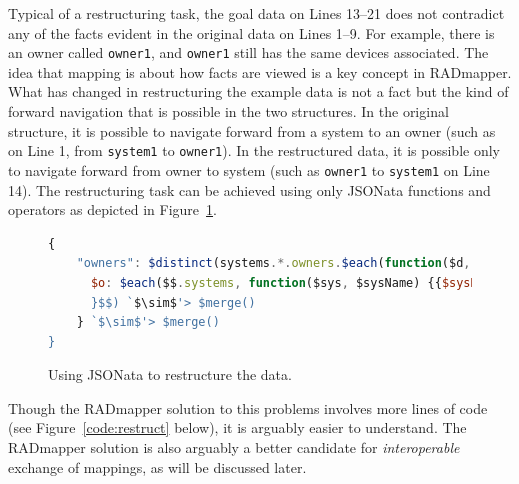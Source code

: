 \documentclass[10pt,letterpaper]{article} %
\newcommand{\stt}[1]{\texttt{#1}} %
\begin{document}
Typical of a restructuring task, the goal data on Lines 13--21 does not contradict any of the facts evident in the original data on Lines 1--9.
For example, there is an owner called \stt{owner1}, and \stt{owner1} still has the same devices associated.
The idea that mapping is about how facts are viewed is a key concept in RADmapper.
What has changed in restructuring the example data is not a fact but the kind of forward navigation that is possible in the two structures.
In the original structure, it is possible to navigate forward from a system to an owner (such as on Line 1, from \stt{system1} to \stt{owner1}).
In the restructured data, it is possible only to navigate forward from owner to system (such as \stt{owner1} to \stt{system1} on Line 14).
The restructuring task can be achieved using only JSONata functions and operators as depicted in Figure~\ref{code:jsonata-sTPDRs}.

\begin{figure}[H]
\caption{Using JSONata to restructure the data.}
 \label{code:jsonata-sTPDRs}
\begin{lstlisting}[language=JavaScript,basicstyle=\ttfamily\scriptsize,numberstyle=\scriptsize,escapeinside=`']
{
    "owners": $distinct(systems.*.owners.$each(function($d, $ownerName) {$ownerName}))@$o.{
      $o: $each($$.systems, function($sys, $sysName) {{$sysName: $lookup(}.systems, $sysName).owners `$\sim$'> $lookup($o)
      }$$) `$\sim$'> $merge()
    } `$\sim$'> $merge()
}
\end{lstlisting}
\end{figure} \vspace{-3em}

Though the RADmapper solution to this problems involves more lines of code (see Figure~\ref{code:restruct} below), it is arguably easier to understand.
The RADmapper solution is also arguably a better candidate for \textit{interoperable} exchange of mappings, as will be discussed later.
\end{document}

